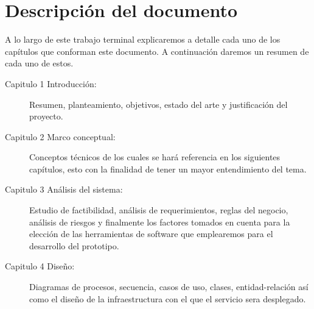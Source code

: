 \newpage
\section{Descripción del documento}

    A lo largo de este trabajo terminal explicaremos a detalle cada uno de los capítulos que conforman este documento. A continuación daremos un resumen de cada uno de estos.

    \begin{description}
        \item[Capitulo 1 Introducción:] Resumen, planteamiento, objetivos, estado del arte y justificación del proyecto.
        \item[Capitulo 2 Marco conceptual:] Conceptos técnicos de los cuales se hará referencia en los siguientes capítulos, esto con la finalidad de tener un mayor entendimiento del tema.
        \item[Capitulo 3 Análisis del sistema:] Estudio de factibilidad, análisis de requerimientos, reglas del negocio, análisis de riesgos y finalmente los factores tomados en cuenta para la elección de las herramientas de software que emplearemos para el desarrollo del prototipo.
        \item[Capitulo 4 Diseño:] Diagramas de procesos, secuencia, casos de uso, clases, entidad-relación así como el diseño de la infraestructura con el que el servicio sera desplegado. 
    \end{description}



 
 
